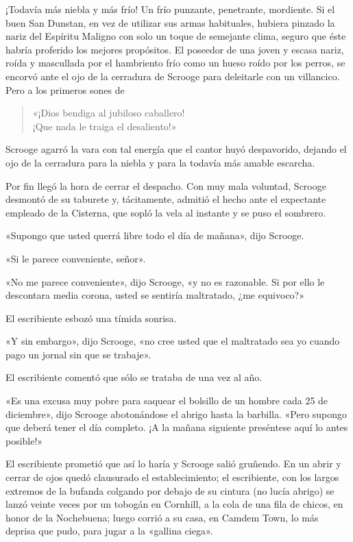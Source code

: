 \documentclass{novela}
\begin{document}
 ¡Todavía más niebla y más frío! Un frío punzante, penetrante, mordiente. Si el buen San Dunstan, en vez de utilizar sus armas habituales, hubiera pinzado la nariz del Espíritu Maligno con solo un toque de semejante clima, seguro que éste habría proferido los mejores propósitos. El poseedor de una joven y escasa nariz, roída  y mascullada por el hambriento frío como un hueso roído por los perros, se encorvó ante el ojo de la cerradura de Scrooge para deleitarle con un villancico. Pero a los primeros sones de
 \begin{verse}
	 «¡Dios bendiga al jubiloso caballero!\\
	 ¡Que nada le traiga el desaliento!»
 \end{verse}



 Scrooge agarró la vara con tal energía que el cantor huyó despavorido, dejando el ojo de la cerradura para la niebla y para la todavía más amable escarcha.

 Por fin llegó la hora de cerrar el despacho. Con muy mala voluntad, Scrooge desmontó de su taburete y, tácitamente, admitió el hecho ante el expectante empleado de la Cisterna, que sopló la vela al instante y se puso el sombrero.

 «Supongo que usted querrá libre todo el día de mañana», dijo Scrooge.

 «Si le parece conveniente, señor».

 «No me parece conveniente», dijo Scrooge, «y no es razonable. Si por ello le descontara media corona, usted se sentiría maltratado, ¿me equivoco?»

 El escribiente esbozó una tímida sonrisa.

 «Y sin embargo», dijo Scrooge, «no cree usted que el maltratado sea yo cuando pago un jornal sin que se trabaje».

 El escribiente comentó que sólo se trataba de una vez al año.

 «Es una excusa muy pobre para saquear el bolsillo de un hombre cada 25 de diciembre», dijo Scrooge abotonándose el abrigo hasta la barbilla. «Pero supongo que deberá tener el día completo. ¡A la mañana siguiente preséntese aquí lo antes posible!»

 El escribiente prometió que así lo haría y Scrooge salió gruñendo. En un abrir y cerrar de ojos quedó clausurado el establecimiento; el escribiente, con los largos extremos de la bufanda colgando por debajo de su cintura (no lucía abrigo) se lanzó veinte veces por un tobogán en Cornhill, a la cola de una fila de chicos, en honor de la Nochebuena; luego corrió a su casa, en Camdem Town, lo más deprisa que pudo, para jugar a la «gallina ciega».
\end{document}
